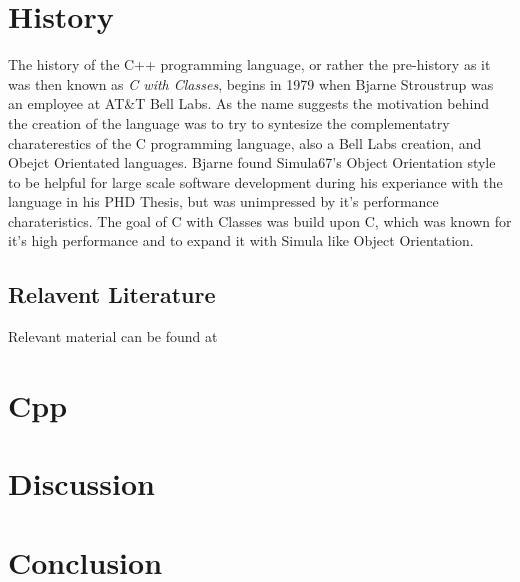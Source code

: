 \documentclass[conference, a4paper]{IEEEtran}
\begin{document}
\cite{cppevolving} 
\cite{cpphome}


\section{History}

The history of the C++ programming language, or rather the pre-history as it was then known as \textit{C with Classes}, begins in 1979 when Bjarne Stroustrup was an employee at AT\&T Bell Labs. As the name suggests the motivation behind the creation of the language was to try to syntesize the complementatry charaterestics of the C programming language, also a Bell Labs creation, and Obejct Orientated languages. Bjarne found Simula67's Object Orientation style to be helpful for large scale software development during his experiance with the language in his PHD Thesis, but was unimpressed by it's performance charateristics. The goal of C with Classes was build upon C, which was known for it's high performance and to expand it with Simula like Object Orientation.

\subsection{Relavent Literature}
Relevant material can be found at \cite{cpphome,cpp_1986,cpphistory,cppoverview,cppevolving,alexandrescu2001modern}

\section{Cpp}

\section{Discussion}

\section{Conclusion}



\end{document}
